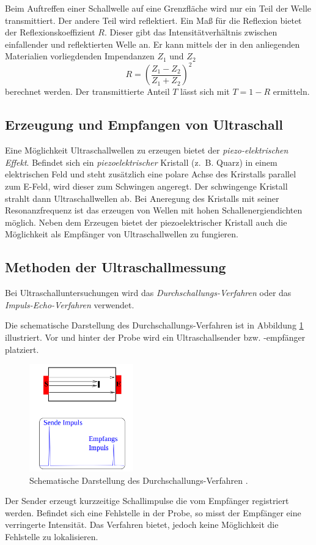 Beim Auftreffen einer Schallwelle auf eine Grenzfläche wird nur ein Teil der
Welle transmittiert. Der andere Teil wird reflektiert.
Ein Maß für die Reflexion bietet der Reflexionskoeffizient $R$.
Dieser gibt das Intensitätverhältnis zwischen einfallender und reflektierten Welle an.
Er kann mittels der in den anliegenden Materialien vorliegdenden Impendanzen $Z_1$ und $Z_2$
\begin{equation*}
  R=\left(\frac{Z_1-Z_2}{Z_1+Z_2}\right)^2
\end{equation*}
berechnet werden.
Der transmittierte Anteil $T$ lässt sich mit $T=1-R$ ermitteln.

\subsection{Erzeugung und Empfangen von Ultraschall}

Eine Möglichkeit Ultraschallwellen zu erzeugen bietet der \emph{piezo-elektrischen Effekt}.
Befindet sich ein \emph{piezoelektrischer} Kristall (z.\, B. Quarz) in einem elektrischen Feld und steht
zusätzlich eine polare Achse des Krirstalls parallel zum E-Feld, wird dieser %
zum Schwingen angeregt. Der schwingenge Kristall strahlt dann Ultraschallwellen ab.
Bei Aneregung des Kristalls mit seiner Resonanzfrequenz ist das erzeugen von Wellen mit hohen %
Schallenergiendichten möglich. %
Neben dem Erzeugen bietet der piezoelektrischer Kristall auch die Möglichkeit
als Empfänger von Ultraschallwellen zu fungieren.

\subsection{Methoden der Ultraschallmessung}
Bei Ultraschalluntersuchungen wird das \emph{Durchschallungs-Verfahren} oder
das \emph{Impuls-Echo-Verfahren} verwendet.

Die schematische Darstellung des Durchschallungs-Verfahren ist in Abbildung
\ref{fig: durch} illustriert. Vor und hinter der Probe wird ein Ultraschallsender bzw. -empfänger
platziert.
\begin{figure}[h]
  \centering
  \includegraphics[width=0.4\textwidth]{pics/durchsall.png}
  \caption{Schematische Darstellung des Durchschallungs-Verfahren \cite{anleitungus1}.}
  \label{fig: durch}
  \end{figure}
Der Sender erzeugt kurzzeitige Schallimpulse die vom Empfänger
registriert werden. Befindet sich eine Fehlstelle in der Probe, so misst der Empfänger
eine verringerte Intensität.
Das Verfahren bietet, jedoch keine Möglichkeit die Fehlstelle zu lokalisieren. %


